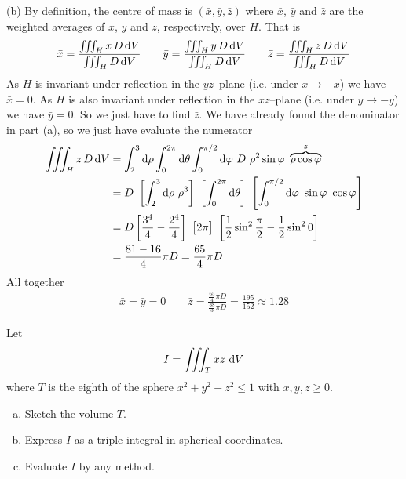 \begin{solution}
(b) By definition, the centre of mass is $(\bar x,\bar y,\bar z)$
where $\bar x$, $\bar y$ and $\bar z$ are the weighted averages of
$x$, $y$ and $z$, respectively, over $H$. That is
\begin{align*}
\bar x =\frac{\iiint_H x\,D\,\mathrm{d}V}{\iiint_H D\,\mathrm{d}V}\qquad
\bar y =\frac{\iiint_H y\,D\,\mathrm{d}V}{\iiint_H D\,\mathrm{d}V}\qquad
\bar z =\frac{\iiint_H z\,D\,\mathrm{d}V}{\iiint_H D\,\mathrm{d}V}
\end{align*}
As $H$ is invariant under reflection in the $yz$--plane (i.e. under
$x\rightarrow-x$) we have $\bar x=0$.
As $H$ is also invariant under reflection in the $xz$--plane (i.e. under
$y\rightarrow-y$) we have $\bar y=0$.
So we just have to find $\bar z$. We have already found the denominator in part 
(a), so we just have evaluate the numerator
\begin{align*}
\tripInt_H z\,D\,\dee{V}
&=\int_2^3\dee{\rho} \int_0^{2\pi}\dee{\theta}\int_0^{\pi/2}\dee{\varphi}\ 
           D\ \rho^2\sin\varphi\ \overbrace{\rho\cos\varphi}^{z} \\
&=D\ \left[\int_2^3\dee{\rho}\ \rho^3\right]\ 
     \left[\int_0^{2\pi}\dee{\theta}\right]\ 
     \left[\int_0^{\pi/2}\dee{\varphi}\ \sin\varphi\ \cos\varphi\right] \\
&= D\left[\frac{3^4}{4}-\frac{2^4}{4}\right]\ 
     \big[2\pi\big]\ 
     \left[\frac{1}{2}\sin^2\frac{\pi}{2} -\frac{1}{2}\sin^2 0\right] \\
&=\frac{81-16}{4}\pi D
=\frac{65}{4}\pi D
\end{align*}
All together
\begin{align*}
\bar x = \bar y=0\qquad
\bar z =\frac{\frac{65}{4}\pi D}{\frac{38}{3}\pi D}
       =\frac{195}{152}
       \approx 1.28
\end{align*}
\end{solution}

\begin{question}[M200 2008D] %
Let
\begin{equation*}
I = \iiint_T xz\ \mathrm{d}V
\end{equation*}
where $T$ is the eighth of the sphere $x^2 + y^2 + z^2 \le 1$ with 
$x,y,z \ge 0$.
\begin{enumerate}[(a)]
\item
Sketch the volume $T$.

\item
Express $I$ as a triple integral in spherical coordinates.

\item
Evaluate $I$ by any method.

\end{enumerate}
\end{question}

